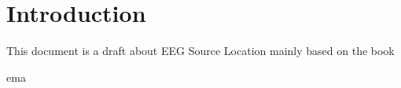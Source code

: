 \documentclass[11pt]{article}
\begin{document}
\section{Introduction}
\label{Introduction}

This document is a draft about EEG Source Location mainly based on the book~\cite{gulrajani1998bioelectricity}
\cite{Cao:2011io, Masterton:2013gs}

\cite{Cao:2011io}

ema\cite{Chang:2013in}



\end{document}
